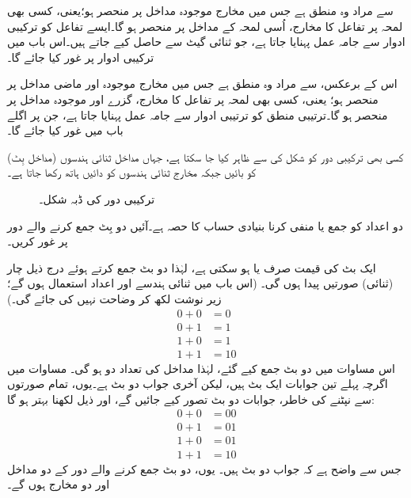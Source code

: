  سے مراد وہ منطق ہے جس میں مخارج موجودہ مداخل پر منحصر ہو؛یعنی، 
 کسی بھی لمحہ پر تفاعل کا مخارج، اُسی لمحہ کے مداخل پر منحصر ہو گا۔ایسے تفاعل کو ترکیبی ادوار سے جامہ عمل پہنایا جاتا ہے، جو ثنائی گیٹ سے حاصل کیے جاتے ہیں۔اس باب میں ترکیبی ادوار پر غور کیا جائے گا۔

اس کے برعکس، سے مراد وہ منطق ہے جس میں مخارج موجودہ اور ماضی مداخل پر منحصر ہو؛ یعنی، کسی بھی لمحہ پر تفاعل کا مخارج، گزرے اور موجودہ مداخل پر منحصر ہو گا۔ترتیبی منطق کو ترتیبی ادوار سے جامہ عمل پہنایا جاتا ہے، جن پر اگلے باب میں غور کیا جائے گا۔

کسی بھی ترکیبی دور کو شکل  کی  سے ظاہر کیا جا سکتا ہے، جہاں مداخل ثنائی ہندسوں (مداخل بِٹ) کو بائیں جبکہ مخارج ثنائی ہندسوں کو دائیں ہاتھ رکھا جاتا ہے۔
\begin{figure}
\centering
{}
\caption{ترکیبی دور کی ڈبہ شکل۔}
\label{شکل_ترکیبی_ڈبہ_دور}
\end{figure}
دو اعداد کو جمع یا منفی کرنا بنیادی حساب کا حصہ ہے۔آئیں دو بِٹ جمع کرنے والے دور پر غور کریں۔

 ایک بٹ کی قیمت صرف  یا  ہو سکتی ہے، لہٰذا دو بٹ جمع کرتے ہوئے درج ذیل چار (ثنائی) صورتیں پیدا ہوں گی۔ (اس باب میں ثنائی ہندسے اور اعداد استعمال ہوں گے؛ زیر نوشت  لکھ کر وضاحت نہیں کی جائے گی۔)
\begin{align*}
0+0&=0\\
0+1&=1\\
1+0&=1\\
1+1&=10
\end{align*}
اس مساوات میں دو بٹ جمع کیے گئے، لہٰذا مداخل کی تعداد دو ہو گی۔ مساوات میں اگرچہ پہلے تین جوابات ایک بٹ ہیں، لیکن آخری جواب دو بٹ ہے۔یوں، تمام صورتوں سے نپٹنے کی خاطر، جوابات دو بٹ تصور کیے جائیں گے، اور ذیل لکھنا بہتر ہو گا:
\begin{align*}
0+0&=00\\
0+1&=01\\
1+0&=01\\
1+1&=10
\end{align*}
جس سے واضح ہے کہ جواب دو بٹ ہیں۔ یوں، دو بٹ جمع کرنے والے دور کے دو مداخل اور دو مخارج ہوں گے۔

